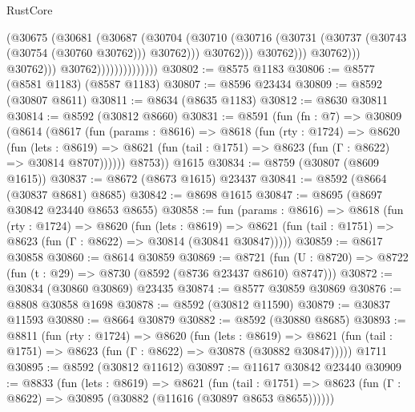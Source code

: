\begin{lexlean}{RustCore}
\begin{coremodule}
                                              (@30675
                                                (@30681
                                                  (@30687
                                                    (@30704
                                                      (@30710
                                                        (@30716
                                                          (@30731
                                                            (@30737
                                                              (@30743 (@30754 (@30760 @30762)))
                                                              @30762)))
                                                        @30762)))
                                                  @30762)))
                                            @30762)))
                                      @30762)))
                                @30762))))))))))))))
@30802 := @8575 @1183
@30806 := @8577 (@8581 @1183) (@8587 @1183)
@30807 := @8596 @23434
@30809 := @8592 (@30807 @8611)
@30811 := @8634 (@8635 @1183)
@30812 := @8630 @30811
@30814 := @8592 (@30812 @8660)
@30831 := @8591
    (fun (fn : @7) =>
    @30809
      (@8614
        (@8617
          (fun (params : @8616) =>
          @8618
            (fun (rty : @1724) =>
            @8620
              (fun (lets : @8619) =>
              @8621 (fun (tail : @1751) => @8623 (fun (Γ : @8622) => @30814 @8707))))))
        @8753))
    @1615
@30834 := @8759 (@30807 (@8609 @1615))
@30837 := @8672 (@8673 @1615) @23437
@30841 := @8592 (@8664 (@30837 @8681) @8685)
@30842 := @8698 @1615
@30847 := @8695 (@8697 @30842 @23440 @8653 @8655)
@30858 := fun (params : @8616) =>
  @8618
    (fun (rty : @1724) =>
    @8620
      (fun (lets : @8619) =>
      @8621 (fun (tail : @1751) => @8623 (fun (Γ : @8622) => @30814 (@30841 @30847)))))
@30859 := @8617 @30858
@30860 := @8614 @30859
@30869 := @8721
    (fun (U : @8720) => @8722 (fun (t : @29) => @8730 (@8592 (@8736 @23437 @8610) @8747)))
@30872 := @30834 (@30860 @30869) @23435
@30874 := @8577 @30859 @30869
@30876 := @8808 @30858 @1698
@30878 := @8592 (@30812 @11590)
@30879 := @30837 @11593
@30880 := @8664 @30879
@30882 := @8592 (@30880 @8685)
@30893 := @8811
    (fun (rty : @1724) =>
    @8620
      (fun (lets : @8619) =>
      @8621 (fun (tail : @1751) => @8623 (fun (Γ : @8622) => @30878 (@30882 @30847)))))
    @1711
@30895 := @8592 (@30812 @11612)
@30897 := @11617 @30842 @23440
@30909 := @8833
    (fun (lets : @8619) =>
    @8621
      (fun (tail : @1751) =>
      @8623 (fun (Γ : @8622) => @30895 (@30882 (@11616 (@30897 @8653 @8655))))))

\end{coremodule}
\end{lexlean}
